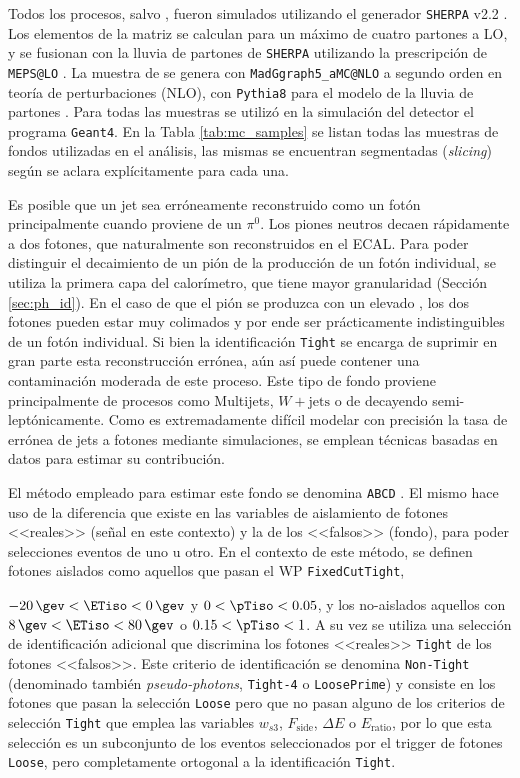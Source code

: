 Todos los procesos, salvo \ttbarph, fueron simulados utilizando el generador {\texttt{SHERPA} v2.2} \cite{Bothmann:2019yzt}. Los elementos de la matriz se calculan para un máximo de cuatro partones
a LO, y se fusionan con la lluvia de partones de \texttt{SHERPA} \cite{Schumann:2007mg} utilizando la prescripción de \texttt{MEPS@LO} \cite{Hoeche:2012yf}. La muestra de \ttbarph se genera con \texttt{MadGgraph5\_aMC@NLO} \cite{Alwall:2014hca} a segundo orden en teoría de perturbaciones (NLO), con \texttt{Pythia8} para el modelo de la lluvia de partones \cite{Sjostrand:2014zea}. 
Para todas las muestras se utilizó en la simulación del detector el programa \texttt{Geant4}. En la Tabla \ref{tab:mc_samples} se listan todas las muestras de fondos utilizadas en el análisis, las mismas se encuentran segmentadas (\textit{slicing}) según se aclara explícitamente para cada una.



Es posible que un jet sea erróneamente reconstruido como un fotón principalmente cuando proviene de un $\pi^0$. Los piones neutros decaen rápidamente a dos fotones, que naturalmente son reconstruidos en el ECAL. Para poder distinguir el decaimiento de un pión de la producción de un fotón individual, se utiliza la primera capa del calorímetro, que tiene mayor granularidad (Sección \ref{sec:ph_id}). En el caso de que el pión se produzca con un elevado \pt, los dos fotones pueden estar muy colimados y por ende ser prácticamente indistinguibles de un fotón individual. Si bien la identificación \texttt{Tight} se encarga de suprimir en gran parte esta reconstrucción errónea, aún así puede contener una contaminación moderada de este proceso. Este tipo de fondo proviene principalmente de procesos como Multijets, $W+\text{jets}$ o de \ttbar decayendo semi-leptónicamente. 
Como es extremadamente difícil modelar con precisión la tasa de errónea de jets a fotones mediante simulaciones, se emplean técnicas basadas en datos para estimar su contribución.


El método empleado para estimar este fondo se denomina \texttt{ABCD} \cite{Alonso:2233238}. El mismo hace uso de la diferencia que existe en las variables de aislamiento de fotones <<reales>> (señal en este contexto) y la de los <<falsos>> (fondo), para poder selecciones eventos de uno u otro.
En el contexto de este método, se definen fotones aislados como aquellos que pasan el WP \texttt{FixedCutTight},

 $-20\,\gev<\ETiso<0\,\gev$ y $0<\pTiso<0.05$, y los no-aislados aquellos con $8\,\gev<\ETiso<80\,\gev$ o $0.15<\pTiso<1$.
A su vez se utiliza una selección de identificación adicional que discrimina los fotones <<reales>> \texttt{Tight} de los fotones <<falsos>>. Este criterio de identificación se denomina \texttt{Non-Tight} (denominado también \textit{pseudo-photons}, \texttt{Tight-4} o \texttt{LoosePrime}) y consiste en los fotones que pasan la selección \texttt{Loose} pero que no pasan alguno de los criterios de selección \texttt{Tight} que emplea las variables $w_{s3}$, $F_{\text{side}}$, $\Delta E$ o $E_{\text{ratio}}$, por lo que esta selección es un subconjunto de los eventos seleccionados por el trigger de fotones \texttt{Loose}, pero completamente ortogonal a la identificación \texttt{Tight}. 


